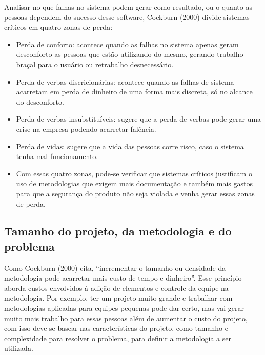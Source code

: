     Analisar no que falhas no sistema podem gerar como resultado, ou o quanto as pessoas dependem do sucesso desse software, Cockburn (2000) divide sistemas críticos em quatro zonas de perda:
\begin{itemize}
\item Perda de conforto: acontece quando as falhas no sistema apenas geram desconforto as pessoas que estão utilizando do mesmo, gerando trabalho braçal para o usuário ou retrabalho desnecessário.

\item Perda de verbas discricionárias: acontece quando as falhas de sistema acarretam em perda de dinheiro de uma forma mais discreta, só no alcance do desconforto.

\item Perda de verbas insubstituíveis: sugere que a perda de verbas pode gerar uma crise na empresa podendo acarretar falência.

\item Perda de vidas: sugere que a vida das pessoas corre risco, caso o sistema tenha mal funcionamento.

\item Com essas quatro zonas, pode-se verificar que sistemas críticos justificam o uso de metodologias que exigem mais documentação e também mais gastos para que a segurança do produto não seja violada e venha gerar essas zonas de perda.
\end{itemize}

\subsection{Tamanho do projeto, da metodologia e do problema}

    Como Cockburn (2000) cita, “incrementar o tamanho ou densidade da metodologia pode acarretar mais custo de tempo e dinheiro”. Esse princípio aborda custos envolvidos à adição de elementos e controle da equipe na metodologia.
    Por exemplo, ter um projeto muito grande e trabalhar com metodologias aplicadas para equipes pequenas pode dar certo, mas vai gerar muito mais trabalho para essas pessoas além de aumentar o custo do projeto, com isso deve-se basear nas características do projeto, como tamanho e complexidade para resolver o problema, para definir a metodologia a ser utilizada.
        
